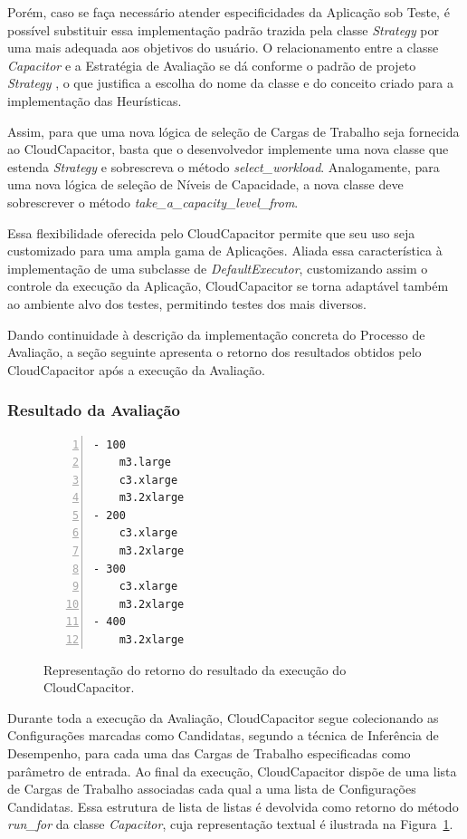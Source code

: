 Porém, caso se faça necessário atender especificidades da Aplicação sob Teste, 
é possível substituir essa implementação padrão trazida pela classe \emph{Strategy} 
por uma mais adequada aos objetivos do usuário. O relacionamento entre a classe 
\emph{Capacitor} e a Estratégia de Avaliação se dá conforme o padrão de projeto 
\emph{Strategy} \cite{gamma}, o que justifica a escolha 
do nome da classe e do conceito criado para a implementação das Heurísticas.

Assim, para que uma nova lógica de seleção de Cargas de Trabalho seja fornecida
ao CloudCapacitor, basta que o desenvolvedor implemente uma nova classe que estenda
\emph{Strategy} e sobrescreva o método \emph{select\_workload}. Analogamente,
para uma nova lógica de seleção de Níveis de Capacidade, a nova classe deve 
sobrescrever o método \emph{take\_a\_capacity\_level\_from}.

Essa flexibilidade oferecida pelo CloudCapacitor permite que seu uso seja 
customizado para uma ampla gama de Aplicações. Aliada essa característica à 
implementação de uma subclasse de \emph{DefaultExecutor}, customizando assim o 
controle da execução da Aplicação, CloudCapacitor se torna adaptável também ao
ambiente alvo dos testes, permitindo testes dos mais diversos.

Dando continuidade à descrição da implementação concreta do Processo de Avaliação,
a seção seguinte apresenta o retorno dos resultados obtidos pelo CloudCapacitor
após a execução da Avaliação.

\subsubsection{Resultado da Avaliação}
\label{subsubsec:funcionamento_resultado}

\begin{figure}[t]
 \begin{lstlisting}[linewidth=\textwidth,xleftmargin=.04\textwidth, numbers=left]
- 100
    m3.large
    c3.xlarge
    m3.2xlarge
- 200
    c3.xlarge
    m3.2xlarge
- 300
    c3.xlarge
    m3.2xlarge
- 400
    m3.2xlarge
  \end{lstlisting}
  \caption{\label{fig:resultado}Representação do retorno do resultado da execução do CloudCapacitor.}
\end{figure}

Durante toda a execução da Avaliação, CloudCapacitor segue colecionando as
Configurações marcadas como Candidatas, segundo a técnica de Inferência de 
Desempenho, para cada uma das Cargas de Trabalho especificadas como parâmetro de 
entrada. Ao final da execução, CloudCapacitor dispõe de uma lista de Cargas de Trabalho 
associadas cada qual a uma lista de Configurações Candidatas. Essa estrutura de
lista de listas é devolvida como retorno do método \emph{run\_for} da classe 
\emph{Capacitor}, cuja representação textual é ilustrada na Figura~\ref{fig:resultado}. 

